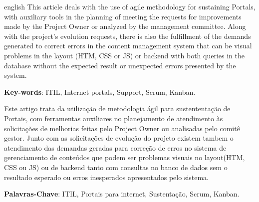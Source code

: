 \documentclass[
	article,			%
	11pt,				%
	oneside,			%
	a4paper,			%
	english,			%
	brazil,				%
	]{abntex2}
\begin{document}
\frenchspacing 


%
%

\renewcommand{\resumoname}{Abstract}
\begin{resumoumacoluna}
 \begin{otherlanguage*}{english}
	This article deals with the use of agile methodology for sustaining Portals, with auxiliary tools in the planning of meeting the requests for improvements made by the Project Owner or analyzed by the management committee. Along with the project's evolution requests, there is also the fulfillment of the demands generated to correct errors in the content management system that can be visual problems in the layout (HTM, CSS or JS) or backend with both queries in the database without the expected result or unexpected errors presented by the system.

   \vspace{\onelineskip}

   \noindent
   \textbf{Key-words}: ITIL, Internet portals, Support, Scrum, Kanban.
 \end{otherlanguage*}  
\end{resumoumacoluna}

\renewcommand{\resumoname}{Resumo}
\begin{resumoumacoluna}
  Este artigo trata da utilização de metodologia ágil para sustententação de Portais, com ferramentas auxiliares no planejamento de atendimento às solicitações de melhorias feitas pelo Project Owner ou analisadas pelo comitê gestor. Junto com as solicitações de evolução do projeto existem tambem o atendimento das demandas geradas para correção de erros no sistema de gerenciamento de conteúdos que podem ser problemas visuais no layout(HTM, CSS ou JS) ou de backend tanto com consultas no banco de dados sem o resultado esperado ou erros inesperados apresentados pelo sistema.
  
\vspace{\onelineskip}

\noindent \textbf{Palavras-Chave}: ITIL, Portais para internet, Sustentação, Scrum, Kanban.
\end{resumoumacoluna}
\end{document}
